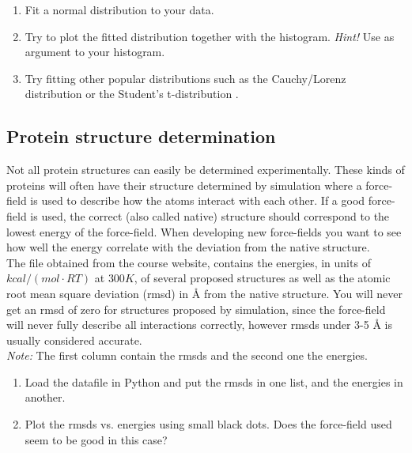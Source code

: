 \documentclass{article}
\begin{document}
\begin{enumerate}[resume]

    \item Fit a normal distribution to your data.

    \item Try to plot the fitted distribution together with the histogram. \emph{Hint!} Use  as argument to your histogram.

    \item Try fitting other popular distributions such as the Cauchy/Lorenz distribution  or the Student's t-distribution .

\end{enumerate}


\newpage
\subsection{Protein structure determination}

Not all protein structures can easily be determined experimentally.
These kinds of proteins will often have their structure determined by simulation where a force-field is used to describe how the atoms interact with each other.
If a good force-field is used, the correct (also called native) structure should correspond to the lowest energy of the force-field.
When developing new force-fields you want to see how well the energy correlate with the deviation from the native structure.\\

The file  obtained from the course website, contains the energies, in units of $kcal/(mol\cdot RT)$ at $300K$, of several proposed structures as well as the atomic root mean square deviation (rmsd) in Å from the native structure.
You will never get an rmsd of zero for structures proposed by simulation, since the force-field will never fully describe all interactions correctly, however rmsds under 3-5 Å is usually considered accurate.\\

\emph{Note:} The first column contain the rmsds and the second one the energies.


\begin{enumerate}[start=1]

    \item Load the datafile in Python and put the rmsds in one list, and the energies in another.

    \item Plot the rmsds vs. energies using small black dots. Does the force-field used seem to be good in this case?

\end{enumerate}
\end{document}
